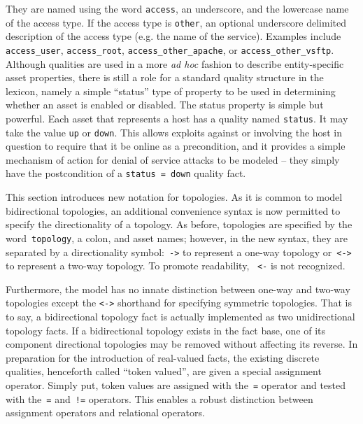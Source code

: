 They are named using the word \texttt{access}, an underscore, 
and the lowercase name of the access type. If the access type is \texttt{other},
an optional underscore delimited description of the access type (e.g. the name 
of the service). Examples include
\texttt{access\_user}, \texttt{access\_root}, \texttt{access\_other\_apache}, or
\texttt{access\_other\_vsftp}.
Although qualities are used in a more \emph{ad hoc} fashion to describe entity-specific
asset properties, there is still a role for a standard quality structure in the
lexicon, namely a simple ``status'' type of property to be used in determining
whether an asset is enabled or disabled.
The status property is simple but powerful. Each asset that represents a host has a
quality named \texttt{status}. It may take the value \texttt{up} or \texttt{down}.
This allows exploits against or involving the host in question to require that it
be online as a precondition, and it provides a simple mechanism of action for
denial of service attacks to be modeled -- they simply have the postcondition of
a \texttt{status = down} quality fact.

This section introduces new notation for topologies. As it
is common to model bidirectional topologies, an additional convenience syntax
is now permitted to specify the directionality of a topology. As before, 
topologies are specified by the word~\texttt{topology}, a colon, 
and asset names; however, in the new syntax,
they are separated by a directionality symbol:~\texttt{->} to 
represent a one-way topology
or~\texttt{<->} to represent a two-way topology. To promote readability,
~\texttt{<-} is not recognized.

Furthermore, the model has no innate distinction between one-way and two-way
topologies except the \texttt{<->} shorthand for specifying symmetric topologies.
That is to say, a bidirectional topology fact is actually implemented as
two unidirectional topology facts. If a bidirectional
topology exists in the fact base, one of its component directional topologies may
be removed without affecting its reverse.
In preparation for the introduction of real-valued facts, the existing discrete
qualities, henceforth called ``token valued'', are given a special
assignment operator. Simply put, token values are assigned with the~\texttt{=}
operator and tested with the~\texttt{=} and~\texttt{!=} operators. This
enables a robust distinction between assignment operators and relational
operators.

